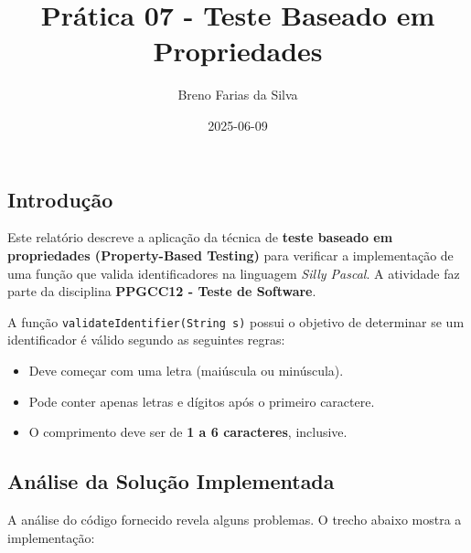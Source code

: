 \documentclass[
  letterpaper,
  DIV=11,
  numbers=noendperiod]{scrartcl}
\title{Prática 07 - Teste Baseado em Propriedades}
\author{Breno Farias da Silva}
\date{2025-06-09}
\providecommand{\tightlist}{%
  \setlength{\itemsep}{0pt}\setlength{\parskip}{0pt}}
\begin{document}
\maketitle


\subsection{Introdução}\label{introduuxe7uxe3o}

Este relatório descreve a aplicação da técnica de \textbf{teste baseado
em propriedades (Property-Based Testing)} para verificar a implementação
de uma função que valida identificadores na linguagem \emph{Silly
Pascal}. A atividade faz parte da disciplina \textbf{PPGCC12 - Teste de
Software}.

A função \texttt{validateIdentifier(String\ s)} possui o objetivo de
determinar se um identificador é válido segundo as seguintes regras:

\begin{itemize}
\tightlist
\item
  Deve começar com uma letra (maiúscula ou minúscula).
\item
  Pode conter apenas letras e dígitos após o primeiro caractere.
\item
  O comprimento deve ser de \textbf{1 a 6 caracteres}, inclusive.
\end{itemize}

\subsection{Análise da Solução
Implementada}\label{anuxe1lise-da-soluuxe7uxe3o-implementada}

A análise do código fornecido revela alguns problemas. O trecho abaixo
mostra a implementação:
\end{document}
